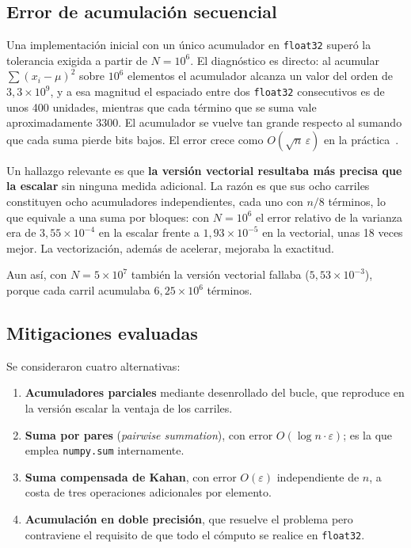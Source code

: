 \documentclass[journal]{IEEEtran}
\begin{document}
\subsection{Error de acumulación secuencial}
\label{sec:acumulacion}

Una implementación inicial con un único acumulador en \texttt{float32}
superó la tolerancia exigida a partir de $N = 10^6$. El diagnóstico es
directo: al acumular $\sum (x_i - \mu)^2$ sobre $10^6$ elementos el
acumulador alcanza un valor del orden de $3,3\times10^9$, y a esa
magnitud el espaciado entre dos \texttt{float32} consecutivos es de unos
400 unidades, mientras que cada término que se suma vale
aproximadamente 3300. El acumulador se vuelve tan grande respecto al
sumando que cada suma pierde bits bajos. El error crece como
$O(\sqrt{n}\,\varepsilon)$ en la práctica~\cite{higham2002}.

Un hallazgo relevante es que \textbf{la versión vectorial resultaba más
precisa que la escalar} sin ninguna medida adicional. La razón es que sus
ocho carriles constituyen ocho acumuladores independientes, cada uno con
$n/8$ términos, lo que equivale a una suma por bloques: con $N = 10^6$ el
error relativo de la varianza era de $3,55\times10^{-4}$ en la escalar
frente a $1,93\times10^{-5}$ en la vectorial, unas 18 veces mejor. La
vectorización, además de acelerar, mejoraba la exactitud.

Aun así, con $N = 5\times10^7$ también la versión vectorial fallaba
($5,53\times10^{-3}$), porque cada carril acumulaba $6,25\times10^6$
términos.

\subsection{Mitigaciones evaluadas}

Se consideraron cuatro alternativas:

\begin{enumerate}
  \item \textbf{Acumuladores parciales} mediante desenrollado del bucle,
        que reproduce en la versión escalar la ventaja de los carriles.
  \item \textbf{Suma por pares} (\textit{pairwise summation}), con error
        $O(\log n \cdot \varepsilon)$; es la que emplea \texttt{numpy.sum}
        internamente.
  \item \textbf{Suma compensada de Kahan}, con error $O(\varepsilon)$
        independiente de $n$, a costa de tres operaciones adicionales por
        elemento.
  \item \textbf{Acumulación en doble precisión}, que resuelve el
        problema pero contraviene el requisito de que todo el cómputo se
        realice en \texttt{float32}.
\end{enumerate}
\end{document}
